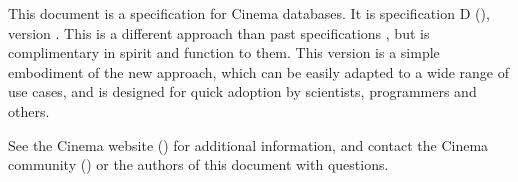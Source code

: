 This document is a specification for Cinema databases. It is specification D
(\dietrich), version \version. This is a different approach than past specifications
\cite{cinemaSpecA}\cite{cinemaSpecC}, but is complimentary in spirit and
function to them. This version is a simple embodiment of the new approach,
which can be easily adapted to a wide range of use cases, and is designed for
quick adoption by scientists, programmers and others.

See the Cinema website (\cinemawebsite) for additional information, and contact
the Cinema community (\cinemaemail) or the authors of this document with
questions.
